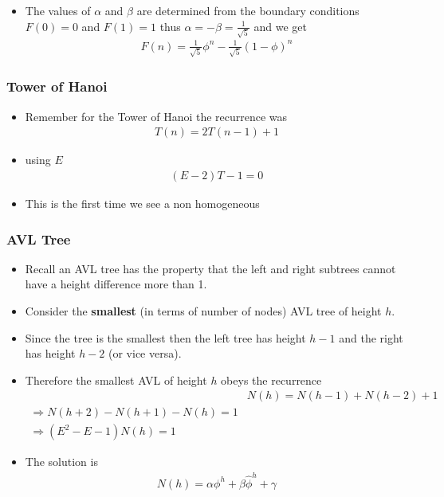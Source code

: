 \documentclass{beamer}
\begin{document}
\begin{frame}
  \begin{itemize}
  \item The values of $\alpha$ and $\beta$ are determined from the boundary conditions
$F(0)=0$ and $F(1)=1$ thus $\alpha=-\beta=\frac{1}{\sqrt{5}}$ and we get
\begin{align*}
  F(n)=\frac{1}{\sqrt{5}}\phi^n-\frac{1}{\sqrt{5}}(1-\phi)^n
\end{align*}

  \end{itemize}
\end{frame}
\begin{frame}
  \frametitle{Tower of Hanoi}
\begin{itemize}
  \item Remember for the Tower of Hanoi the recurrence was
  \begin{align*}
    T(n)=2T(n-1)+1
  \end{align*}
  \item using $E$
  \begin{align*}
    (E-2)T-1=0
  \end{align*}
  \item This is the first time we see a non homogeneous 
\end{itemize}
  

\end{frame}
\begin{frame}
  \frametitle{AVL Tree}
  \begin{itemize}
  \item Recall an AVL tree has the property that the left and right subtrees cannot have a height difference more than 1.
\item Consider the \textbf{smallest} (in terms of number of nodes) AVL tree of height $h$.
\item Since the tree is the smallest then the left tree has height $h-1$ and the right has height $h-2$ (or vice versa).
\item Therefore the smallest AVL of height $h$ obeys the recurrence
  \begin{align*}
   &N(h)=N(h-1)+N(h-2)+1 \\
\Rightarrow N(h+2)-N(h+1)-N(h)=1\\
\Rightarrow (E^2-E-1)N(h)=1
  \end{align*}
\item The solution is
  \begin{align*}
    N(h)=\alpha \phi^h+\beta \hat{\phi}^h+\gamma
  \end{align*}
  \end{itemize}
\end{frame}
\end{document}
